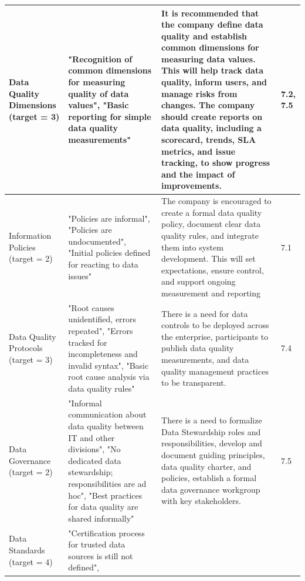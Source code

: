 \documentclass[conference]{IEEEtran}
\begin{document}
\begin{table}[hbt!]
\begin{tabular}{|p{2cm}|p{5cm}|p{5cm}|p{2cm}|}
\hline
Data Quality Dimensions (target = 3) & "Recognition of common dimensions for measuring quality of data values", "Basic reporting for simple data quality measurements" & It is recommended that the company define data quality and establish common dimensions for measuring data values. This will help track data quality, inform users, and manage risks from changes. The company should create reports on data quality, including a scorecard, trends, SLA metrics, and issue tracking, to show progress and the impact of improvements. & 7.2, 7.5 \\
\hline
Information Policies (target = 2) & "Policies are informal", "Policies are undocumented", "Initial policies defined for reacting to data issues" & The company is encouraged to create a formal data quality policy, document clear data quality rules, and integrate them into system development. This will set expectations, ensure control, and support ongoing measurement and reporting & 7.1 \\
\hline
Data Quality Protocols (target = 3) &
"Root causes unidentified, errors repeated", 
"Errors tracked for incompleteness and invalid syntax", 
"Basic root cause analysis via data quality rules"
& 
There is a need for data controls to be deployed across the enterprise, participants to publish data quality measurements, and data quality management practices to be transparent.
& 7.4\\
\hline
Data Governance (target = 2)& 
"Informal communication about data quality between IT and other divisions", 
"No dedicated data stewardship; responsibilities are ad hoc", 
"Best practices for data quality are shared informally"
&
There is a need to formalize Data Stewardship roles and responsibilities, develop and document guiding principles, data quality charter, and policies, establish a formal data governance workgroup with key stakeholders.
& 7.5 \\
\hline
Data Standards (target = 4) & 
"Certification process for trusted data sources is still not defined", 

\end{tabular}
\end{table}
\end{document}
